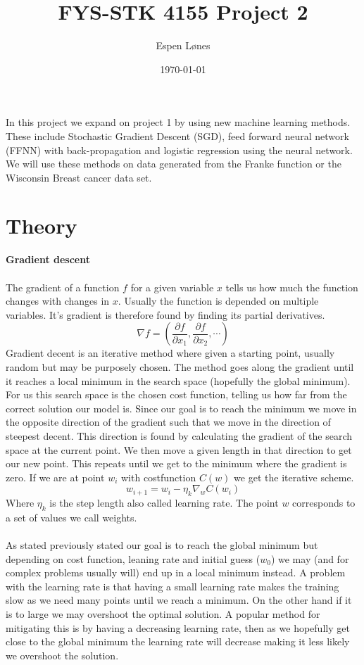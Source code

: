 \documentclass[12pt, letterpaper, twoside]{article}
\begin{document}
\title{FYS-STK 4155 Project 2 }
\author{Espen Lønes}
\date{\today}
\maketitle
In this project we expand on project 1 by using new machine learning methods.
These include Stochastic Gradient Descent (SGD), feed forward neural network (FFNN) with back-propagation and logistic regression using the neural network.
We will use these methods on data generated from the Franke function or the Wisconsin Breast cancer data set.\\
\section{Theory}
\textbf{Gradient descent}\\
\ \\
The gradient of a function $f$ for a given variable $x$ tells us how much the function changes with changes in $x$. Usually the function is depended on multiple variables. It's gradient is therefore found by finding its partial derivatives.
$$
\nabla f = \left( \frac{\partial f}{\partial x_1}, \frac{\partial f}{\partial x_2}, \cdots \right)
$$
Gradient decent is an iterative method where given a starting point, usually random but may be purposely chosen. The method goes along the gradient until it reaches a local minimum in the search space (hopefully  the global minimum). For us this search space is the chosen cost function, telling us how far from the correct solution our model is. Since our goal is to reach the minimum we move in the opposite direction of the gradient such that we move in the direction of steepest decent. This direction is found by calculating the gradient of the search space at the current point. We then move a given length in that direction to get our new point. This repeats until we get to the minimum where the gradient is zero. If we are at point $w_i$ with costfunction $C(w)$ we get the iterative scheme.
$$
w_{i+1} = w_i - \eta_k \nabla_w C(w_i)
$$
Where $\eta_k$ is the step length also called learning rate. The point $w$ corresponds to a set of values we call weights.\\
\ \\
As stated previously stated our goal is to reach the global minimum but depending on cost function, leaning rate and initial guess ($w_0$) we may (and for complex problems usually will) end up in a local minimum instead. A problem with the learning rate is that having a small learning rate makes the training slow as we need many points until we reach a minimum. On the other hand if it is to large we may overshoot the optimal solution. A popular method for mitigating this is by having a decreasing learning rate, then as we hopefully get close to the global minimum the learning rate will decrease making it less likely we overshoot the solution.\\
\end{document}
